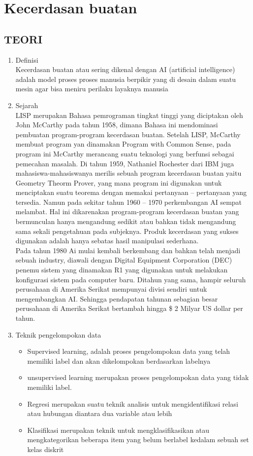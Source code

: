 \chapter{Kecerdasan buatan}
\section{TEORI}
\begin{enumerate}
	\item Definisi\\
	Kecerdasan buatan atau sering dikenal dengan AI (artificial intelligence) adalah model proses proses manusia berpikir yang di desain dalam suatu mesin agar bisa meniru perilaku layaknya manusia
	\item Sejarah\\
    LISP merupakan Bahasa pemrograman tingkat tinggi yang diciptakan oleh John McCarthy pada tahun 1958, dimana Bahasa ini mendominasi pembuatan program-program kecerdasan buatan. Setelah LISP, McCarthy membuat program yan dinamakan Program with Common Sense, pada program ini McCarthy merancang suatu teknologi yang berfunsi sebagai pemecahan masalah. Di tahun 1959, Nathaniel Rochester dari IBM juga mahasiswa-mahasiswanya merilis sebuah program kecerdasan buatan yaitu Geometry Theorm Prover, yang mana program ini digunakan untuk menciptakan suatu teorema dengan memakai pertanyaan – pertanyaan yang tersedia. Namun pada sekitar tahun 1960 – 1970 perkembangan AI sempat melambat. Hal ini dikarenakan program-program kecerdasan buatan yang bermunculan hanya mengandung sedikit atau bahkan tidak mengandung sama sekali pengetahuan pada subjeknya. Produk kecerdasan yang sukses digunakan adalah hanya sebatas hasil manipulasi sederhana.\\
    Pada tahun 1980 Ai mulai kembali berkembang dan bahkan telah menjadi sebuah industry, diawali dengan Digital Equipment Corporation (DEC) penemu sistem yang dinamakan R1 yang digunakan untuk melakukan konfigurasi sistem pada computer baru. Ditahun yang sama, hampir seluruh perusahaan di Amerika Serikat mempunyai divisi sendiri untuk mengembangkan AI. Sehingga pendapatan tahunan sebagian besar perusahaan di Amerika Serikat bertambah hingga \$ 2 Milyar US dollar per tahun.\\
    \item Teknik pengelompokan data\\
    \begin{itemize}
        \item Supervised learning, adalah proses pengelompokan data yang telah memiliki label dan akan dikelompokan berdasarkan labelnya 
        \item unsupervised learning merupakan proses pengelompokan data yang tidak memiliki label.
        \item Regresi merupakan suatu teknik analisis untuk mengidentifikasi relasi atau hubungan diantara dua variable atau lebih
        \item Klasifikasi merupakan teknik untuk mengklasifikasikan atau mengkategorikan beberapa item yang belum berlabel kedalam sebuah set kelas diskrit
    

\end{itemize}
\end{enumerate}

